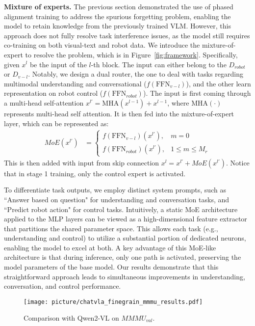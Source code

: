 


\textbf{Mixture of experts.} The previous section demonstrated the use of phased alignment training to address the spurious forgetting problem, enabling the model to retain knowledge from the previously trained VLM. However, this approach does not fully resolve task interference issues, as the model still requires co-training on both visual-text and robot data. We introduce the mixture-of-expert to resolve the problem, which is in Figure~\ref{fig:framework}. Specifically, given $x^l$ be the input of the $l$-th block. The input can either belong to the $D_{robot}$ or $D_{v-l}$. Notably, we design a dual router, the one to deal with tasks regarding multimodal understanding and conversational ($f(\text{FFN}_{v-l})$), and the other learn representation on robot control ($f(\text{FFN}_{robot})$). The input is first coming through a multi-head self-attention $x^{l'} = \text{MHA}(x^{l-1})+x^{l-1}$, where $\text{MHA}(\cdot)$ represents multi-head self attention. It is then fed into the mixture-of-expert layer, which can be represented as:
\begin{align*}
MoE(x^{l'})&=\begin{cases}
f(\text{FFN}_{v-l})(x^{l'}),&m = 0\\
f(\text{FFN}_{robot})(x^{l'}),&1\leq m\leq M_r
\end{cases}
\end{align*}
This is then added with input from skip connection $x^{l} = x^{l'} + MoE(x^{l'})$. Notice that in stage 1 training, only the control expert is activated. 

To differentiate task outputs, we employ distinct system prompts, such as ``Answer based on question" for understanding and conversation tasks, and ``Predict robot action" for control tasks. Intuitively, a static MoE architecture applied to the MLP layers can be viewed as a high-dimensional feature extractor that partitions the shared parameter space. This allows each task (e.g., understanding and control) to utilize a substantial portion of dedicated neurons, enabling the model to excel at both. A key advantage of this MoE-like architecture is that during inference, only one path is activated, preserving the model parameters of the base model. Our results demonstrate that this straightforward approach leads to simultaneous improvements in understanding, conversation, and control performance. 



\begin{figure*}[t]
   \centering
   \texttt{[image: picture/chatvla\_finegrain\_mmmu\_results.pdf]}
   \caption{Comparison with Qwen2-VL on $MMMU_{val}$.}
   \label{fig:mmmu_result}
\end{figure*}

